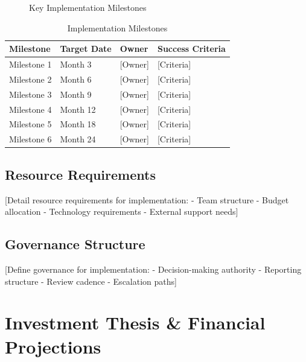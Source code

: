 \documentclass[11pt,letterpaper]{report}
\begin{document}
\begin{figure}[htbp]
\centering
\caption{Key Implementation Milestones}
\label{fig:milestones}
\end{figure}

\begin{table}[htbp]
\centering
\caption{Implementation Milestones}
\begin{tabular}{@{}llll@{}}
\toprule
\textbf{Milestone} & \textbf{Target Date} & \textbf{Owner} & \textbf{Success Criteria} \\
\midrule
Milestone 1 & Month 3 & [Owner] & [Criteria] \\
\rowcolor{tablealt} Milestone 2 & Month 6 & [Owner] & [Criteria] \\
Milestone 3 & Month 9 & [Owner] & [Criteria] \\
\rowcolor{tablealt} Milestone 4 & Month 12 & [Owner] & [Criteria] \\
Milestone 5 & Month 18 & [Owner] & [Criteria] \\
\rowcolor{tablealt} Milestone 6 & Month 24 & [Owner] & [Criteria] \\
\bottomrule
\end{tabular}
\label{tab:milestones}
\end{table}

\section{Resource Requirements}

[Detail resource requirements for implementation:
- Team structure
- Budget allocation
- Technology requirements
- External support needs]

\section{Governance Structure}

[Define governance for implementation:
- Decision-making authority
- Reporting structure
- Review cadence
- Escalation paths]

\chapter{Investment Thesis \& Financial Projections}
\end{document}
